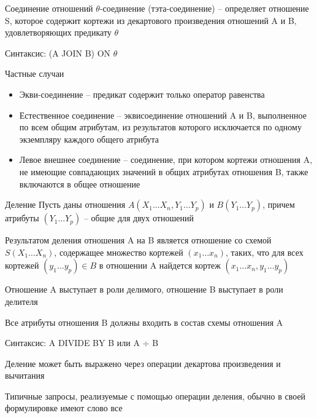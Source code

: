 \documentclass[12pt]{article}
\begin{document}
\begin{defin}{Соединение отношений}
    $\theta$-соединение (тэта-соединение) -- определяет отношение S, которое содержит кортежи из декартового произведения отношений A и B, удовлетворяющих предикату $\theta$

    Синтаксис: (A JOIN B) ON $\theta$

    \begin{Remark}{Частные случаи}
        \begin{itemize}
            \item Экви-соединение -- предикат содержит только оператор равенства 
            \item Естественное соединение -- эквисоединение отношений A и B, выполненное по всем общим атрибутам, из результатов которого исключается по одному экземпляру каждого общего атрибута 
            \item Левое внешнее соединение -- соединение, при котором кортежи отношения A, не имеющие совпадающих значений в общих атрибутах отношения B, также включаются в общее отношение 
        \end{itemize}
    \end{Remark}
\end{defin}

\begin{defin}{Деление}
    Пусть даны отношения $A(X_1 \ldots X_n, Y_1 \ldots Y_p)$ и $B(Y_1 \ldots Y_p)$, причем атрибуты $(Y_1 \ldots Y_p)$ -- общие для двух отношений 

    Результатом деления отношения A на B является отношение со схемой $S(X_1 \ldots X_n)$, содержащее множество кортежей $(x_1 \ldots x_n)$, таких, что для всех кортежей $(y_1 \ldots y_p) \in B$ в отношении A найдется кортеж $(x_1 \ldots x_n, y_1 \ldots y_p)$

    Отношение A выступает в роли делимого, отношение B выступает в роли делителя 

    Все атрибуты отношения B должны входить в состав схемы отношения A 

    Синтаксис: A DIVIDE BY B или A $\div$ B

    \begin{Remark}{}
        Деление может быть выражено через операции декартова произведения и вычитания 

        Типичные запросы, реализуемые с помощью операции деления, обычно в своей формулировке имеют слово все 
    \end{Remark}
\end{defin}
\end{document}
